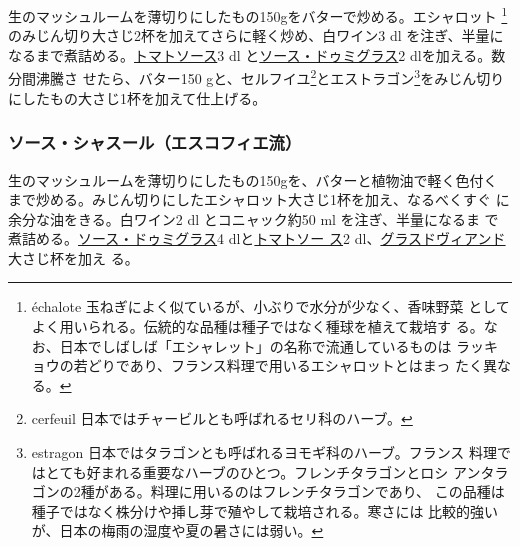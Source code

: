 \begin{recette}
生のマッシュルームを薄切りにしたもの150gをバターで炒める。エシャロット
\footnote{échalote
  玉ねぎによく似ているが、小ぶりで水分が少なく、香味野菜
  としてよく用いられる。伝統的な品種は種子ではなく種球を植えて栽培す
  る。なお、日本でしばしば「エシャレット」の名称で流通しているものは
  ラッキョウの若どりであり、フランス料理で用いるエシャロットとはまっ
  たく異なる。}のみじん切り大さじ2\undemi{}杯を加えてさらに軽く炒め、白ワイン3
dl
を注ぎ、半量になるまで煮詰める。\protect\hyperlink{sauce-tomate}{トマトソース}3
dl と\protect\hyperlink{sauce-demi-glace}{ソース・ドゥミグラス}2
dlを加える。数分間沸騰さ せたら、バター150 gと、セルフイユ\footnote{cerfeuil
  日本ではチャービルとも呼ばれるセリ科のハーブ。}とエストラゴン\footnote{estragon
  日本ではタラゴンとも呼ばれるヨモギ科のハーブ。フランス
  料理ではとても好まれる重要なハーブのひとつ。フレンチタラゴンとロシ
  アンタラゴンの2種がある。料理に用いるのはフレンチタラゴンであり、
  この品種は種子ではなく株分けや挿し芽で殖やして栽培される。寒さには
  比較的強いが、日本の梅雨の湿度や夏の暑さには弱い。}をみじん切り
にしたもの大さじ1\undemi{}杯を加えて仕上げる。

\hypertarget{sauce-chasseur-procede-escoffier}{%
\subsubsection{ソース・シャスール（エスコフィエ流）}\label{sauce-chasseur-procede-escoffier}}



生のマッシュルームを薄切りにしたもの150gを、バターと植物油で軽く色付く
まで炒める。みじん切りにしたエシャロット大さじ1杯を加え、なるべくすぐ
に余分な油をきる。白ワイン2 dl とコニャック約50 ml を注ぎ、半量になるま
で煮詰める。\protect\hyperlink{sauce-demi-glace}{ソース・ドゥミグラス}4
dlと\protect\hyperlink{sauce-tomate}{トマトソー ス}2
dl、\protect\hyperlink{glace-de-viande}{グラスドヴィアンド}大さじ\undemi{}杯を加え
る。


\end{recette}

